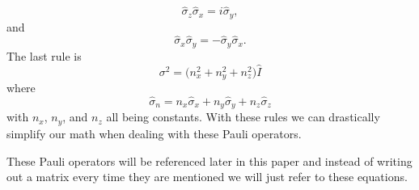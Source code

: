 \documentclass[twocolumn]{article}
\begin{document}
\begin{equation}\label{eq:22}
\hat{\sigma}_z\hat{\sigma}_x=i\hat{\sigma}_y,
\end{equation}
and
\begin{equation}\label{eq:23}
\hat{\sigma}_x\hat{\sigma}_y=-\hat{\sigma}_y\hat{\sigma}_x.
\end{equation}
The last rule is
\begin{equation}\label{eq:24}
\sigma^2=\big(n_x^2+n_y^2+n_z^2\big)\hat{I}
\end{equation}
where
\begin{equation}\label{eq:25}
\hat{\sigma}_n=n_x\hat{\sigma}_x+n_y\hat{\sigma}_y+n_z\hat{\sigma}_z
\end{equation}
with $n_x$, $n_y$, and $n_z$ all being constants. With these rules we can drastically simplify our math when dealing with these Pauli operators.

These Pauli operators will be referenced later in this paper and instead of writing out a matrix every time they are mentioned we will just refer to these equations.
\end{document}
